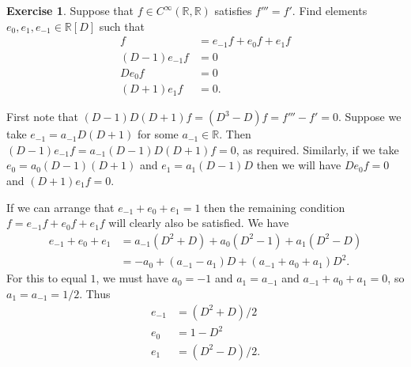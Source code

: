 \documentclass{amsart}
\newcommand{\R}         {{\mathbb{R}}}
\newcommand{\CRR}       {C^\infty(\R,\R)}
\newcommand{\ip}[1]     {\langle #1\rangle}
\renewcommand{\:}{\colon}
\theoremstyle{definition}
\newtheorem{exercise}{Exercise}[section]
\renewenvironment{solution}{\SolutionAtEnd}{\endSolutionAtEnd}
\begin{document}
\begin{exercise}
 Suppose that $f\in\CRR$ satisfies $f'''=f'$.  Find elements
 $e_0,e_1,e_{-1}\in\R[D]$ such that 
 \begin{align*}
  f &= e_{-1}f + e_0f + e_1f \\
  (D-1)e_{-1}f &= 0 \\
  D e_0f &= 0 \\
  (D+1)e_1 f &= 0. 
 \end{align*}
\end{exercise}
\begin{solution}
 First note that $(D-1)D(D+1)f=(D^3-D)f=f'''-f'=0$.  Suppose we take
 $e_{-1}=a_{-1}D(D+1)$ for some $a_{-1}\in\R$.  Then
 $(D-1)e_{-1}f=a_{-1}(D-1)D(D+1)f=0$, as required.  Similarly, if we
 take $e_0=a_0(D-1)(D+1)$ and $e_1=a_1(D-1)D$ then we will have
 $De_0f=0$ and $(D+1)e_1f=0$.

 If we can arrange that $e_{-1}+e_0+e_1=1$ then the remaining
 condition $f=e_{-1}f+e_0f+e_1f$ will clearly also be satisfied.  We
 have
 \begin{align*}
  e_{-1}+e_0+e_1 &= a_{-1}(D^2+D) + a_0(D^2-1) + a_1(D^2-D) \\
   &= -a_0 +  (a_{-1}-a_1)D + (a_{-1}+a_0+a_1)D^2.
 \end{align*}
 For this to equal $1$, we must have $a_0=-1$ and $a_1=a_{-1}$ and
 $a_{-1}+a_0+a_1=0$, so $a_1=a_{-1}=1/2$.  Thus
 \begin{align*}
  e_{-1} &= (D^2+D)/2 \\
  e_0    &= 1-D^2 \\
  e_1    &= (D^2-D)/2. 
 \end{align*}
\end{solution}
\end{document}
